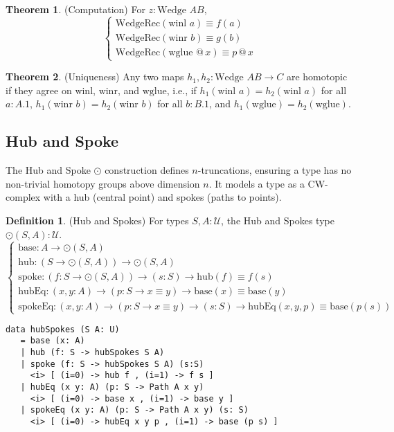 \documentclass{article}
\theoremstyle{definition}
\newtheorem{theorem}{Theorem}
\newtheorem{definition}{Definition}
\begin{document}
\begin{theorem} (Computation)
For $z : \text{Wedge } A B$,
\[
\begin{cases}
\text{WedgeRec}(\text{winl } a) \equiv f(a) \\
\text{WedgeRec}(\text{winr } b) \equiv g(b) \\
\text{WedgeRec}(\text{wglue } @ \, x) \equiv p \, @ \, x
\end{cases}
\]
\end{theorem}

\begin{theorem} (Uniqueness)
Any two maps $h_1, h_2 : \text{Wedge } A B \to C$ are homotopic if
they agree on $\text{winl}$, $\text{winr}$, and $\text{wglue}$,
i.e., if $h_1(\text{winl } a) = h_2(\text{winl } a)$ for
all $a : A.1$, $h_1(\text{winr } b) = h_2(\text{winr } b)$ for
all $b : B.1$, and $h_1(\text{wglue}) = h_2(\text{wglue})$.
\end{theorem}

\newpage
\subsection{Hub and Spoke}
The Hub and Spoke $\odot$ construction defines $n$-truncations,
ensuring a type has no non-trivial homotopy groups above
dimension $n$. It models a type as a CW-complex with a
hub (central point) and spokes (paths to points).

\begin{definition} (Hub and Spokes)
For types $S, A : \mathcal{U}$, the Hub and Spokes type $\odot(S,A) : \mathcal{U}$.
\[
\begin{cases}
\text{base} : A \to \odot(S,A) \\
\text{hub} : (S \to \odot(S,A)) \to \odot(S,A) \\
\text{spoke} : (f : S \to \odot(S,A)) \to (s : S) \to \text{hub}(f) \equiv f(s) \\
\text{hubEq} : (x, y : A) \to (p : S \to x \equiv y) \to \text{base}(x) \equiv \text{base}(y) \\
\text{spokeEq} : (x, y : A) \to (p : S \to x \equiv y) \to (s : S) \to \text{hubEq}(x,y,p) \equiv \text{base}(p(s))
\end{cases}
\]
\begin{lstlisting}
data hubSpokes (S A: U)
   = base (x: A)
   | hub (f: S -> hubSpokes S A)
   | spoke (f: S -> hubSpokes S A) (s:S)
     <i> [ (i=0) -> hub f , (i=1) -> f s ]
   | hubEq (x y: A) (p: S -> Path A x y)
     <i> [ (i=0) -> base x , (i=1) -> base y ]
   | spokeEq (x y: A) (p: S -> Path A x y) (s: S)
     <i> [ (i=0) -> hubEq x y p , (i=1) -> base (p s) ]
\end{lstlisting}
\end{definition}
\end{document}
